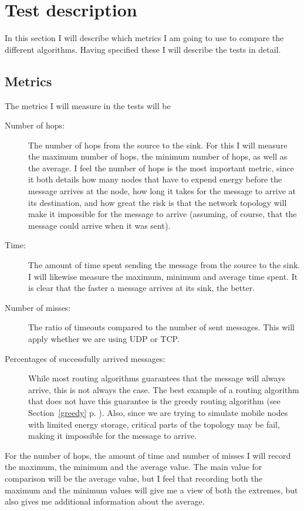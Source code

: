 \section{Test description}
In this section I will describe which metrics I am going to use to compare the different algorithms. Having specified these I will describe the tests in detail.

\subsection{Metrics}

The metrics I will measure in the tests will be 
\begin{description}
\item[Number of hops:] The number of hops from the source to the sink. For this I will measure the maximum number of hops, the minimum number of hops, as well as the average. I feel the number of hops is the most important metric, since it both details how many nodes that have to expend energy before the message arrives at the node, how long it takes for the message to arrive at its destination, and how great the risk is that the network topology will make it impossible for the message to arrive (assuming, of course, that the message could arrive when it was sent).

\item[Time:] The amount of time spent sending the message from the source to the sink. I will likewise measure the maximum, minimum and average time spent. It is clear that the faster a message arrives at its sink, the better.

\item[Number of misses:] The ratio of timeouts compared to the number of sent messages. This will apply whether we are using UDP or TCP. 

\item[Percentages of successfully arrived messages:] While most routing algorithms guarantees that the message will always arrive, this is not always the case. The best example of a routing algorithm that does not have this guarantee is the greedy routing algorithm (see Section~\ref{greedy} p. \pageref{greedy}). Also, since we are trying to simulate mobile nodes with limited energy storage, critical parts of the topology may be fail, making it impossible for the message to arrive.
\end{description}

For the number of hops, the amount of time and number of misses I will record the maximum, the minimum and the average value. The main value for comparison will be the average value, but I feel that recording both the maximum and the minimum values will give me a view of both the extremes, but also gives me additional information about the average.

